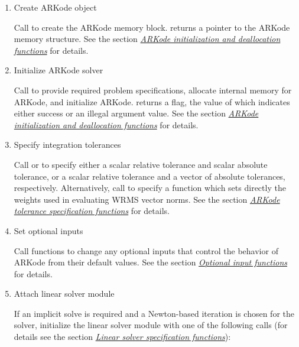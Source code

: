 \documentclass[letterpaper,10pt,english]{sphinxmanual}
\begin{document}
\begin{enumerate}
\item {} 
Create ARKode object

Call  to create the ARKode memory
block. {\hyperref[c_interface/User_callable:ARKodeCreate]{}} returns a pointer to the ARKode memory
structure. See the section {\hyperref[c_interface/User_callable:cinterface-initialization]{\emph{ARKode initialization and deallocation functions}}} for
details.

\item {} 
Initialize ARKode solver

Call {\hyperref[c_interface/User_callable:ARKodeInit]{}} to provide required problem specifications,
allocate internal memory for ARKode, and initialize
ARKode. {\hyperref[c_interface/User_callable:ARKodeInit]{}} returns a flag, the value of which indicates
either success or an illegal argument value. See the section
{\hyperref[c_interface/User_callable:cinterface-initialization]{\emph{ARKode initialization and deallocation functions}}} for details.

\item {} 
Specify integration tolerances

Call {\hyperref[c_interface/User_callable:ARKodeSStolerances]{}} or {\hyperref[c_interface/User_callable:ARKodeSVtolerances]{}} to
specify either a scalar relative tolerance and scalar absolute
tolerance, or a scalar relative tolerance and a vector of absolute
tolerances, respectively. Alternatively, call {\hyperref[c_interface/User_callable:ARKodeWFtolerances]{}}
to specify a function which sets directly the weights used in
evaluating WRMS vector norms. See the section
{\hyperref[c_interface/User_callable:cinterface-tolerances]{\emph{ARKode tolerance specification functions}}} for details.

\item {} 
Set optional inputs

Call  functions to change any optional inputs that
control the behavior of ARKode from their default values. See
the section {\hyperref[c_interface/User_callable:cinterface-optionalinputs]{\emph{Optional input functions}}} for details.

\item {} 
Attach linear solver module

If an implicit solve is required and a Newton-based iteration is
chosen for the solver, initialize the linear solver module with one
of the following calls (for details see the section
{\hyperref[c_interface/User_callable:cinterface-linearsolvers]{\emph{Linear solver specification functions}}}):


\end{enumerate}
\end{document}

